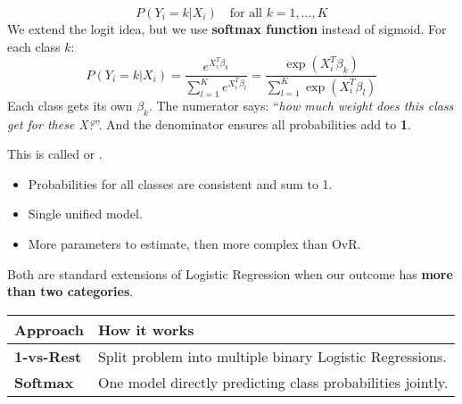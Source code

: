 \begin{itemize}
\begin{equation}
        P(Y_i = k | X_i) \quad \text{for all } k = 1, \dots, K
    \end{equation}
    We extend the logit idea, but we use \textbf{softmax function} instead of sigmoid. For each class $k$:
    \begin{equation}
        P\left(Y_i = k | X_i\right) = \dfrac{
            e^{X_i^T \beta_k}
        }{
            \displaystyle\sum_{l=1}^{K} e^{X_i^T \beta_l}
        }
        =
        \dfrac{
            \exp\left(X_i^T \beta_k\right)
        }{
            \displaystyle\sum_{l=1}^{K} \exp\left(X_i^T \beta_l\right)
        }
    \end{equation}
    Each class gets its own $\beta_k$. The numerator says: ``\emph{how much weight does this class get for these X?}''. And the denominator ensures all probabilities add to \textbf{1}.

    This is called  or . 

    \begin{itemize}
        \item[\textcolor{Green3}{\faIcon{check}}] Probabilities for all classes are consistent and sum to 1.
        \item[\textcolor{Green3}{\faIcon{check}}] Single unified model.
        \item[\textcolor{Red2}{\faIcon{times}}] More parameters to estimate, then more complex than OvR.
    \end{itemize}
\end{itemize}
Both are standard extensions of Logistic Regression when our outcome has \textbf{more than two categories}.

\begin{table}[!htp]
    \centering
    \begin{tabular}{@{} l l @{}}
        \toprule
        Approach & How it works \\
        \midrule
        \textbf{1-vs-Rest}  & Split problem into multiple binary Logistic Regressions. \\ [.3em]
        \textbf{Softmax}    & One model directly predicting class probabilities jointly. \\
        \bottomrule
    \end{tabular}
\end{table}